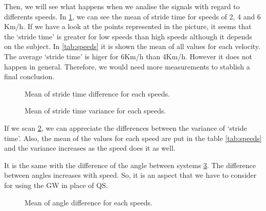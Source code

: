 Then, we will see what happens when we analise the signals with regard to differents speeds. In \ref{fig:speed_stride_time}, we can see the mean of stride time for speeds of 2, 4 and 6 Km/h. If we have a look at the points represented in the picture, it seems that the ‘stride time’ is greater for low speeds than high speeds although it depends on the subject. In \ref{tab:speeds} it is shown the mean of all values for each velocity. The average ‘stride time’ is higer for 6Km/h than 4Km/h. However it does not happen in general. Therefore, we would need more measurements to stablish a final conclusion.

\begin{figure}[H]
	\centering
	\caption{Mean of stride time difference for each speeds.}
	\label{fig:speed_stride_time}
\end{figure}

\begin{figure}[H]
	\centering
	\caption{Mean of stride time variance for each speeds.}
	\label{fig:speed_var_stride_time}
\end{figure}

If we scan \ref{fig:speed_var_stride_time}, we can appreciate the differences between the variance of ‘stride time’. Also, the mean of the values for each speed are put in the table \ref{tab:speeds} and the variance increases as the speed does it as well.

It is the same with the difference of the angle between systems \ref{fig:speed_angle}. The difference between angles increases with speed. So, it is an aspect that we have to consider for using the GW in place of QS.

\begin{figure}[H]
	\centering
	\caption{Mean of angle difference for each speeds.}
	\label{fig:speed_angle}
\end{figure}


